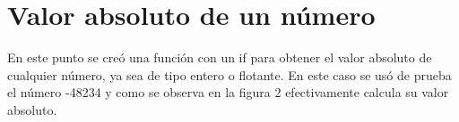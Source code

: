 \documentclass[
  letterpaper, 
  maincolor=black,
  sectioncolor=black!90,
  subsectioncolor=black!70,
  itemtextcolor=black!40,
]{fortysecondscv}
\begin{document}
\makefrontsidebar



    \section{Valor absoluto de un número}
    En este punto se creó una función con un if para obtener el valor absoluto de cualquier número, ya sea de tipo entero o flotante. En este caso se usó de prueba el número -48234 y como se observa en la figura 2 efectivamente calcula su valor absoluto.  
    
\end{document}
